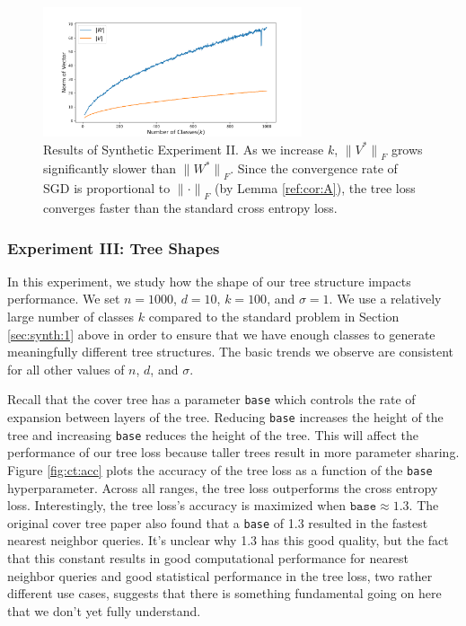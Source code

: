 \documentclass[twoside]{article}
\renewcommand{\star}[1]{{#1}^{*}}
\newcommand{\lF}[1]{{\lVert {#1} \rVert}_F}
\begin{document}
\begin{figure}
\includegraphics[width=\columnwidth,height=1.5in]{fig/images/class_v_norm.png}
\caption{
    Results of Synthetic Experiment II.
    As we increase $k$,
    $\lF{\star V}$ grows significantly slower than $\lF{\star W}$.
    Since the convergence rate of SGD is proportional to $\lF{\cdot}$ (by Lemma \ref{ref:cor:A}),
    the tree loss converges faster than the standard cross entropy loss. 
    }
\label{fig:synth:norm}
\end{figure}


\subsubsection{Experiment III: Tree Shapes}

In this experiment, we study how the shape of our tree structure impacts performance.
We set $n=1000$, $d=10$, $k=100$, and $\sigma=1$.
We use a relatively large number of classes $k$ compared to the standard problem in Section \ref{sec:synth:1} above in order to ensure that we have enough classes to generate meaningfully different tree structures.
The basic trends we observe are consistent for all other values of $n$, $d$, and $\sigma$.

Recall that the cover tree has a parameter \texttt{base} which controls the rate of expansion between layers of the tree.
Reducing \texttt{base} increases the height of the tree and increasing \texttt{base} reduces the height of the tree.
This will affect the performance of our tree loss because taller trees result in more parameter sharing.
Figure \ref{fig:ct:acc} plots the accuracy of the tree loss as a function of the \texttt{base} hyperparameter.
Across all ranges, the tree loss outperforms the cross entropy loss.
Interestingly, the tree loss's accuracy is maximized when $\texttt{base}\approx1.3$.
The original cover tree paper \citep{beygelzimer2006cover} also found that a \texttt{base} of 1.3 resulted in the fastest nearest neighbor queries.
It's unclear why 1.3 has this good quality,
but the fact that this constant results in good computational performance for nearest neighbor queries and good statistical performance in the tree loss, two rather different use cases, suggests that there is something fundamental going on here that we don't yet fully understand.
\end{document}
